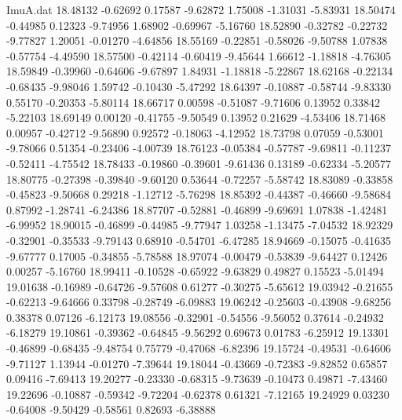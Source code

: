 \begin{filecontents}{ImuA.dat}
  18.48132   -0.62692    0.17587   -9.62872    1.75008   -1.31031   -5.83931
  18.50474   -0.44985    0.12323   -9.74956    1.68902   -0.69967   -5.16760
  18.52890   -0.32782   -0.22732   -9.77827    1.20051   -0.01270   -4.64856
  18.55169   -0.22851   -0.58026   -9.50788    1.07838   -0.57754   -4.49590
  18.57500   -0.42114   -0.60419   -9.45644    1.66612   -1.18818   -4.76305
  18.59849   -0.39960   -0.64606   -9.67897    1.84931   -1.18818   -5.22867
  18.62168   -0.22134   -0.68435   -9.98046    1.59742   -0.10430   -5.47292
  18.64397   -0.10887   -0.58744   -9.83330    0.55170   -0.20353   -5.80114
  18.66717    0.00598   -0.51087   -9.71606    0.13952    0.33842   -5.22103
  18.69149    0.00120   -0.41755   -9.50549    0.13952    0.21629   -4.53406
  18.71468    0.00957   -0.42712   -9.56890    0.92572   -0.18063   -4.12952
  18.73798    0.07059   -0.53001   -9.78066    0.51354   -0.23406   -4.00739
  18.76123   -0.05384   -0.57787   -9.69811   -0.11237   -0.52411   -4.75542
  18.78433   -0.19860   -0.39601   -9.61436    0.13189   -0.62334   -5.20577
  18.80775   -0.27398   -0.39840   -9.60120    0.53644   -0.72257   -5.58742
  18.83089   -0.33858   -0.45823   -9.50668    0.29218   -1.12712   -5.76298
  18.85392   -0.44387   -0.46660   -9.58684    0.87992   -1.28741   -6.24386
  18.87707   -0.52881   -0.46899   -9.69691    1.07838   -1.42481   -6.99952
  18.90015   -0.46899   -0.44985   -9.77947    1.03258   -1.13475   -7.04532
  18.92329   -0.32901   -0.35533   -9.79143    0.68910   -0.54701   -6.47285
  18.94669   -0.15075   -0.41635   -9.67777    0.17005   -0.34855   -5.78588
  18.97074   -0.00479   -0.53839   -9.64427    0.12426    0.00257   -5.16760
  18.99411   -0.10528   -0.65922   -9.63829    0.49827    0.15523   -5.01494
  19.01638   -0.16989   -0.64726   -9.57608    0.61277   -0.30275   -5.65612
  19.03942   -0.21655   -0.62213   -9.64666    0.33798   -0.28749   -6.09883
  19.06242   -0.25603   -0.43908   -9.68256    0.38378    0.07126   -6.12173
  19.08556   -0.32901   -0.54556   -9.56052    0.37614   -0.24932   -6.18279
  19.10861   -0.39362   -0.64845   -9.56292    0.69673    0.01783   -6.25912
  19.13301   -0.46899   -0.68435   -9.48754    0.75779   -0.47068   -6.82396
  19.15724   -0.49531   -0.64606   -9.71127    1.13944   -0.01270   -7.39644
  19.18044   -0.43669   -0.72383   -9.82852    0.65857    0.09416   -7.69413
  19.20277   -0.23330   -0.68315   -9.73639   -0.10473    0.49871   -7.43460
  19.22696   -0.10887   -0.59342   -9.72204   -0.62378    0.61321   -7.12165
  19.24929    0.03230   -0.64008   -9.50429   -0.58561    0.82693   -6.38888

\end{filecontents}
